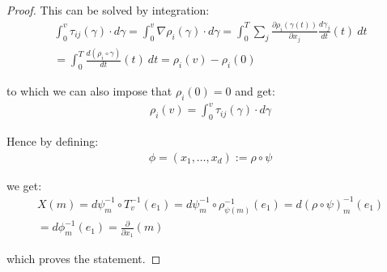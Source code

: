 \begin{proof}
                This can be solved by integration:
                \begin{gather*}
                    \int_{0}^{v} \tau_{ij}(\gamma) \cdot d \gamma = \int_{0}^{v} \nabla \rho_i(\gamma) \cdot d \gamma = \int_0^T \sum_j \frac{\partial \rho_i(\gamma(t))}{\partial x_j} \frac{d \gamma_j}{dt}(t) \: dt \\
                    = \int_0^T \frac{d(\rho_i \circ \gamma)}{dt}(t) \: dt = \rho_i(v) - \rho_i(0)
                \end{gather*}
    
                to which we can also impose that $\rho_i(0) = 0$ and get:
                \begin{align*}
                    \rho_i(v) = \int_{0}^{v} \tau_{ij}(\gamma) \cdot d \gamma
                \end{align*}
    
                Hence by defining:
                \begin{align*}
                    \phi = (x_1, \ldots, x_d) := \rho \circ \psi
                \end{align*}
    
                we get:
                \begin{gather*}
                    X(m) = d \psi_m^{-1} \circ T_v^{-1}(e_1) = d \psi_m^{-1} \circ \rho_{\psi(m)}^{-1}(e_1) = d(\rho \circ \psi)_m^{-1}(e_1) \\
                    = d \phi^{-1}_m(e_1) = \frac{\partial}{\partial x_1}(m)
                \end{gather*}
    
                which proves the statement.
        \end{proof}

\printbibliography


